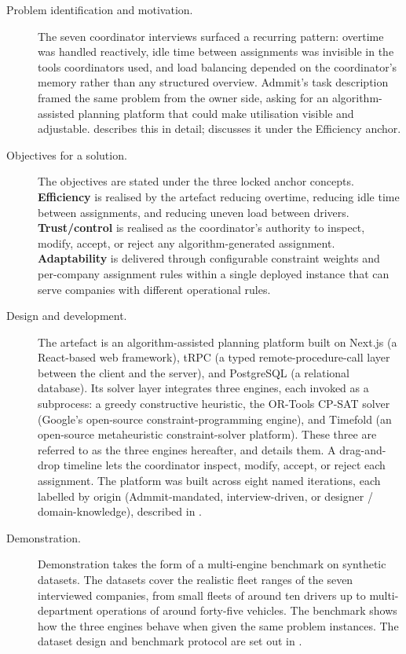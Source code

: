 \begin{description}
  \item[Problem identification and motivation.] The seven coordinator interviews surfaced a recurring pattern: overtime was handled reactively, idle time between assignments was invisible in the tools coordinators used, and load balancing depended on the coordinator's memory rather than any structured overview. Admmit's task description framed the same problem from the owner side, asking for an algorithm-assisted planning platform that could make utilisation visible and adjustable.  describes this in detail;  discusses it under the Efficiency anchor.
  \item[Objectives for a solution.] The objectives are stated under the three locked anchor concepts. \textbf{Efficiency} is realised by the artefact reducing overtime, reducing idle time between assignments, and reducing uneven load between drivers. \textbf{Trust/control} is realised as the coordinator's authority to inspect, modify, accept, or reject any algorithm-generated assignment. \textbf{Adaptability} is delivered through configurable constraint weights and per-company assignment rules within a single deployed instance that can serve companies with different operational rules.
  \item[Design and development.] The artefact is an algorithm-assisted planning platform built on Next.js (a React-based web framework), tRPC (a typed remote-procedure-call layer between the client and the server), and PostgreSQL (a relational database). Its solver layer integrates three engines, each invoked as a subprocess: a greedy constructive heuristic, the OR-Tools CP-SAT solver (Google's open-source constraint-programming engine), and Timefold (an open-source metaheuristic constraint-solver platform). These three are referred to as the three engines hereafter, and  details them. A drag-and-drop timeline lets the coordinator inspect, modify, accept, or reject each assignment. The platform was built across eight named iterations, each labelled by origin (Admmit-mandated, interview-driven, or designer / domain-knowledge), described in .
  \item[Demonstration.] Demonstration takes the form of a multi-engine benchmark on synthetic datasets. The datasets cover the realistic fleet ranges of the seven interviewed companies, from small fleets of around ten drivers up to multi-department operations of around forty-five vehicles. The benchmark shows how the three engines behave when given the same problem instances. The dataset design and benchmark protocol are set out in .

\end{description}

